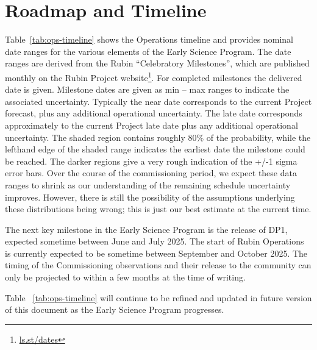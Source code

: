 \section{Roadmap and Timeline} \label{sec:timeline}

Table~\ref{tab:ops-timeline} shows the Operations timeline and provides nominal date ranges for the various elements of the Early Science Program.
The date ranges are derived from the Rubin ``Celebratory Milestones'', which are  published monthly on the Rubin Project website\footnote{\url{ls.st/dates}}. 
For completed milestones the delivered date is given. 
Milestone dates are given as min -- max ranges to indicate the associated uncertainty. 
Typically the near date corresponds to the current Project forecast, plus any additional operational uncertainty.
The late date corresponds approximately to the current Project late date plus any additional operational uncertainty.
The shaded region contains roughly 80\% of the probability, while the lefthand edge of the shaded range indicates the earliest date the milestone could be reached. 
The darker regions give a very rough indication of the +/-1 sigma error bars.
Over the course of the commissioning period, we expect these data ranges to shrink as our understanding of the remaining schedule uncertainty improves. 
However, there is still the possibility of the assumptions underlying these distributions being wrong; this is just our best estimate at the current time.



The next key milestone in the Early Science Program is the release of DP1, expected sometime between June and July 2025.
The  start of Rubin Operations is currently expected to be sometime between September and October 2025.
The timing of the Commissioning observations and their release to the community can only be projected to within a few months at the time of writing.

Table ~\ref{tab:ops-timeline} will continue to be refined and updated in future version of this document as the Early Science Program progresses.